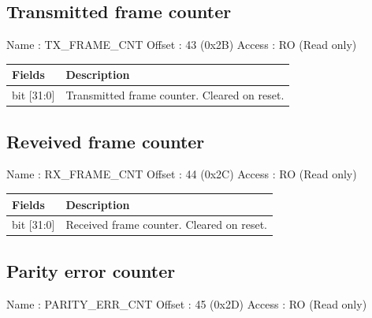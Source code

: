 \documentclass[11pt,a4paper]{article}
\begin{document}
\subsection{Transmitted frame counter}

Name   : TX\_FRAME\_CNT \newline
Offset : 43 (0x2B) \newline
Access : RO (Read only) \newline

\begin{table}[h!]
  \begin{tabularx}{\textwidth}{ l X }
    \hline
    \textbf{Fields} & \textbf{Description}\\
    \hline
    bit [31:0]  & Transmitted frame counter. Cleared on reset. \\
    \hline
  \end{tabularx}
\end{table}

\subsection{Reveived frame counter}

Name   : RX\_FRAME\_CNT \newline
Offset : 44 (0x2C) \newline
Access : RO (Read only) \newline

\begin{table}[h!]
  \begin{tabularx}{\textwidth}{ l X }
    \hline
    \textbf{Fields} & \textbf{Description}\\
    \hline
    bit [31:0]  & Received frame counter. Cleared on reset. \\
    \hline
  \end{tabularx}
\end{table}

\subsection{Parity error counter}

Name   : PARITY\_ERR\_CNT \newline
Offset : 45 (0x2D) \newline
Access : RO (Read only) \newline
\end{document}
